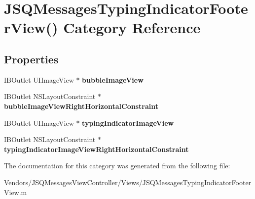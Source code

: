 \hypertarget{category_j_s_q_messages_typing_indicator_footer_view_07_08}{}\section{J\+S\+Q\+Messages\+Typing\+Indicator\+Footer\+View() Category Reference}
\label{category_j_s_q_messages_typing_indicator_footer_view_07_08}
\subsection*{Properties}
\begin{DoxyCompactItemize}
\item 
\hypertarget{category_j_s_q_messages_typing_indicator_footer_view_07_08_accac9132dc9bd991019a944fedcd895f}{}I\+B\+Outlet U\+I\+Image\+View $\ast$ {\bfseries bubble\+Image\+View}\label{category_j_s_q_messages_typing_indicator_footer_view_07_08_accac9132dc9bd991019a944fedcd895f}

\item 
\hypertarget{category_j_s_q_messages_typing_indicator_footer_view_07_08_a98fb76a6d34d840a3cf527a4528097cf}{}I\+B\+Outlet N\+S\+Layout\+Constraint $\ast$ {\bfseries bubble\+Image\+View\+Right\+Horizontal\+Constraint}\label{category_j_s_q_messages_typing_indicator_footer_view_07_08_a98fb76a6d34d840a3cf527a4528097cf}

\item 
\hypertarget{category_j_s_q_messages_typing_indicator_footer_view_07_08_aeb178ed6fd68f18c715ff5eb35aa0302}{}I\+B\+Outlet U\+I\+Image\+View $\ast$ {\bfseries typing\+Indicator\+Image\+View}\label{category_j_s_q_messages_typing_indicator_footer_view_07_08_aeb178ed6fd68f18c715ff5eb35aa0302}

\item 
\hypertarget{category_j_s_q_messages_typing_indicator_footer_view_07_08_a57df19925ea67ecf421512d88e356247}{}I\+B\+Outlet N\+S\+Layout\+Constraint $\ast$ {\bfseries typing\+Indicator\+Image\+View\+Right\+Horizontal\+Constraint}\label{category_j_s_q_messages_typing_indicator_footer_view_07_08_a57df19925ea67ecf421512d88e356247}

\end{DoxyCompactItemize}


The documentation for this category was generated from the following file\+:\begin{DoxyCompactItemize}
\item 
Vendors/\+J\+S\+Q\+Messages\+View\+Controller/\+Views/J\+S\+Q\+Messages\+Typing\+Indicator\+Footer\+View.\+m\end{DoxyCompactItemize}

